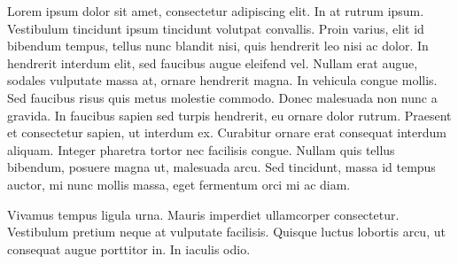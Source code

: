 Lorem ipsum dolor sit amet, consectetur adipiscing elit. In at rutrum ipsum. Vestibulum tincidunt ipsum tincidunt volutpat convallis. Proin varius, elit id bibendum tempus, tellus nunc blandit nisi, quis hendrerit leo nisi ac dolor. In hendrerit interdum elit, sed faucibus augue eleifend vel. Nullam erat augue, sodales vulputate massa at, ornare hendrerit magna. In vehicula congue mollis. Sed faucibus risus quis metus molestie commodo. Donec malesuada non nunc a gravida. In faucibus sapien sed turpis hendrerit, eu ornare dolor rutrum. Praesent et consectetur sapien, ut interdum ex. Curabitur ornare erat consequat interdum aliquam. Integer pharetra tortor nec facilisis congue. Nullam quis tellus bibendum, posuere magna ut, malesuada arcu. Sed tincidunt, massa id tempus auctor, mi nunc mollis massa, eget fermentum orci mi ac diam.

Vivamus tempus ligula urna. Mauris imperdiet ullamcorper consectetur. Vestibulum pretium neque at vulputate facilisis. Quisque luctus lobortis arcu, ut consequat augue porttitor in. In iaculis odio.

